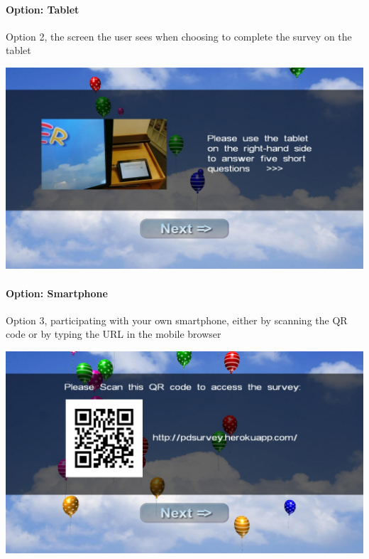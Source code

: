 \clearpage

\paragraph{Option: Tablet}
\label{screenshot:tablet-option}
Option 2, the screen the user sees when choosing to complete the survey on the tablet

\begin{center}
    \includegraphics[width=\columnwidth]{img/screenshots/balloon-game/option-tablet.jpg}
\end{center}



\paragraph{Option: Smartphone}
\label{screenshot:smartphone-option}
Option 3, participating with your own smartphone, either by scanning the QR code or by typing the URL in the mobile browser

\begin{center}
    \includegraphics[width=\columnwidth]{img/screenshots/balloon-game/option-smartphone.jpg}
\end{center}




